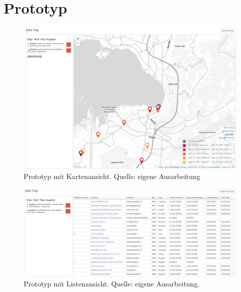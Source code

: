 \documentclass[Bachelorarbeit.tex]{subfiles}
\begin{document}
\chapter{Prototyp}
\label{bilderPrototyp}

\begin{figure}[h]
\centering
\includegraphics[width=1\linewidth]{img/Prototyp/mapView}
\caption[Prototyp mit Kartenansicht]{Prototyp mit Kartenansicht. Quelle: eigene Ausarbeitung}
\label{fig:mapView}
\end{figure}

\begin{figure}[h]
\centering
\includegraphics[width=1\linewidth]{img/Prototyp/listView}
\caption[Prototyp mit Listenansicht]{Prototyp mit Listenansicht. Quelle: eigene Ausarbeitung.}
\label{fig:listView}
\end{figure}
\end{document}
